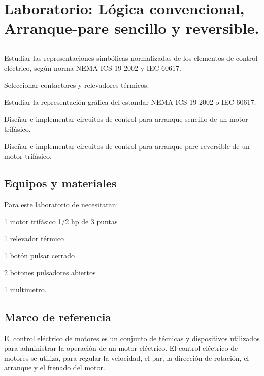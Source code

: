 \chapter{Laboratorio: Lógica convencional, Arranque-pare sencillo y reversible.}


\section{\obj}
\capacidad
\begin{itemize}
	{\small
	 \item  Estudiar  las representaciones simbólicas normalizadas de los elementos de control eléctrico, según norma NEMA ICS 19-2002 y IEC 60617.
	 \item Seleccionar contactores y relevadores térmicos.
	 \item  Estudiar la representación gráfica del estandar NEMA ICS 19-2002 o IEC 60617. 
	 \item  Diseñar e implementar circuitos de control para arranque sencillo de un motor trifásico.
	 \item  Diseñar e implementar circuitos de control para arranque-pare reversible de un  motor trifásico.
 }
\end{itemize} 

 
\section{Equipos y materiales}
Para este laboratorio de necesitaran:
\begin{itemize}
	{\small \item 1 motor trifásico 1/2 hp de 3 puntas
	\item 1 relevador térmico
	\item 1 botón pulsar cerrado
	\item 2 botones pulsadores abiertos
	\item 1 multimetro.
}
\end{itemize}

\section{Marco de referencia}

El control eléctrico de motores es un conjunto de técnicas y dispositivos utilizados para administrar la operación de un motor eléctrico. El control eléctrico de motores se utiliza, para regular la velocidad, el par, la dirección de rotación, el arranque y el frenado del motor.

